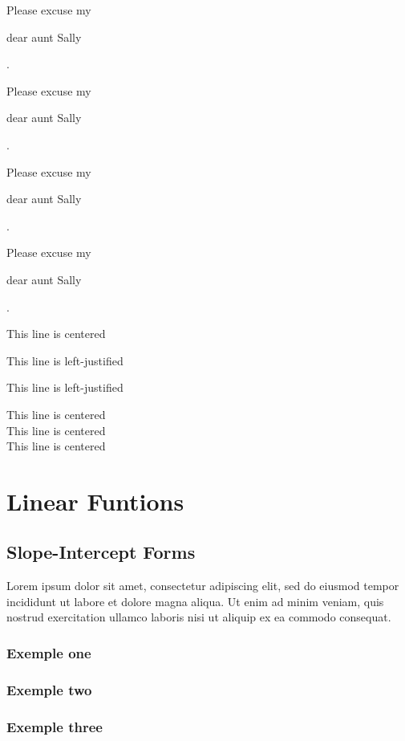 \documentclass[12pt, a4paper]{article}
\newcommand\shortlorem{Lorem ipsum dolor sit amet, consectetur adipiscing elit, sed do eiusmod tempor incididunt ut labore et dolore magna aliqua. Ut enim ad minim veniam, quis nostrud exercitation ullamco laboris nisi ut aliquip ex ea commodo consequat.}
\begin{document}
Please excuse my \begin{normalsize}dear aunt Sally\end{normalsize}.

Please excuse my \begin{small}dear aunt Sally\end{small}.

Please excuse my \begin{scriptsize}dear aunt Sally\end{scriptsize}.

Please excuse my \begin{tiny}dear aunt Sally\end{tiny}.

\vspace*{1cm}

\begin{center} This line is centered \end{center}
\begin{flushleft} This line is left-justified \end{flushleft}
\begin{flushright} This line is left-justified \end{flushright}


\centering
This line is centered\\
This line is centered\\
This line is centered

\flushleft

\section{Linear Funtions}
        \subsection{Slope-Intercept Forms}
                \shortlorem
                \subsubsection{Exemple one}
                \subsubsection{Exemple two}
                \subsubsection{Exemple three}
\end{document}
